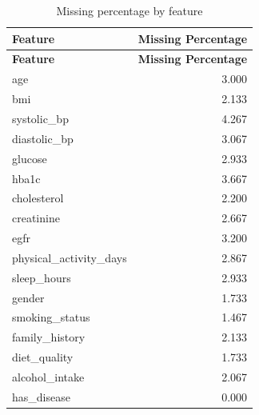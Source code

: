 \documentclass[12pt,a4paper,openany]{report}
\begin{document}
    \begin{longtable}{lr}
    \caption{Missing percentage by feature} \\
    \toprule
    \textbf{Feature} & \textbf{Missing Percentage} \\
    \midrule
    \endfirsthead
    \toprule
    \textbf{Feature} & \textbf{Missing Percentage} \\
    \midrule
    \endhead
    age & 3.000 \\
    bmi & 2.133 \\
    systolic\_bp & 4.267 \\
    diastolic\_bp & 3.067 \\
    glucose & 2.933 \\
    hba1c & 3.667 \\
    cholesterol & 2.200 \\
    creatinine & 2.667 \\
    egfr & 3.200 \\
    physical\_activity\_days & 2.867 \\
    sleep\_hours & 2.933 \\
    gender & 1.733 \\
    smoking\_status & 1.467 \\
    family\_history & 2.133 \\
    diet\_quality & 1.733 \\
    alcohol\_intake & 2.067 \\
    has\_disease & 0.000 \\
    \bottomrule
    \end{longtable}
\end{document}
